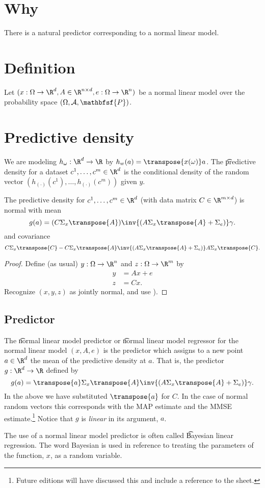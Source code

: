 

\section*{Why}

There is a natural predictor corresponding to a normal linear model.

\section*{Definition}

Let $(x: \Omega  \to \R ^d, A \in \R ^{n \times d}, e: \Omega \to \R ^n)$ be a normal linear model over the probability space $(\Omega , \mathcal{A} , \mathbfsf{P} )$.

\section*{Predictive density}

We are modeling $h_\omega : \R ^d \to \R $ by $h_w(a) = \transpose{x(\omega )}a$.
The \t{predictive density} for a dataset $c^1, \dots , c^m \in \R ^d$ is the conditional density of the random vector $(h_{(\cdot )}(c^1), \dots , h_{(\cdot )}(c^m))$ given $y$.
\begin{proposition}
The predictive density for $c^1, \dots , c^m \in \R ^d$ (with data matrix $C \in \R ^{m \times d}$) is normal with mean
\[
g(a) = (C\Sigma _{x}\transpose{A})\inv{(A\Sigma _{x}\transpose{A} + \Sigma _e)}\gamma .
\]
and covariance
\[
C\Sigma _{x}\transpose{C} - C\Sigma _{x}\transpose{A}\inv{(A\Sigma _{x}\transpose{A} + \Sigma _e)}A\Sigma _{x}\transpose{C}.
\]
\begin{proof}Define (as usual) $y: \Omega  \to \R ^n$ and $z : \Omega  \to \R ^m$ by
\[
\begin{aligned}
y &= Ax + e \\
z &= Cx.
\end{aligned}
\]
Recognize $(x, y, z)$ as jointly normal, and use ).\end{proof}
\end{proposition}


\subsection*{Predictor}

The \t{normal linear model predictor} or \t{normal linear model regressor} for the normal linear model $(x, A, e)$ is the predictor which assigns to a new point $a \in \R ^d$ the mean of the predictive density at $a$.
That is, the predictor $g: \R ^d \to \R $ defined by
\[
g(a) = \transpose{a}\Sigma _{x}\transpose{A}\inv{(A\Sigma _{x}\transpose{A} + \Sigma _e)}\gamma .
\]
In the above we have substituted $\transpose{a}$ for $C$.
In the case of normal random vectors this corresponds with the MAP estimate and the MMSE estimate.\footnote{Future editions will have discussed this and include a reference to the sheet.}
Notice that $g$ is \textit{linear} in its argument, $a$.

The use of a normal linear model predictor is often called \t{Bayesian linear regression}.
The word Bayesian is used in reference to treating the parameters of the function, $x$, as a random variable.
